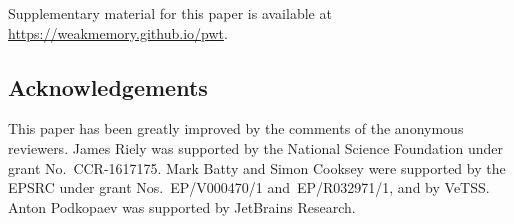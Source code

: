 Supplementary material for this paper is available at
\url{https://weakmemory.github.io/pwt}.

\subsection*{Acknowledgements}
This paper has been greatly improved by the comments of the anonymous reviewers.
%
James Riely was supported by the National Science Foundation under
grant No.~CCR-1617175.
%
Mark Batty and Simon Cooksey were supported by the EPSRC under grant
Nos.~EP/V000470/1 and~EP/R032971/1, and by VeTSS.
%
Anton Podkopaev was supported by JetBrains Research.


